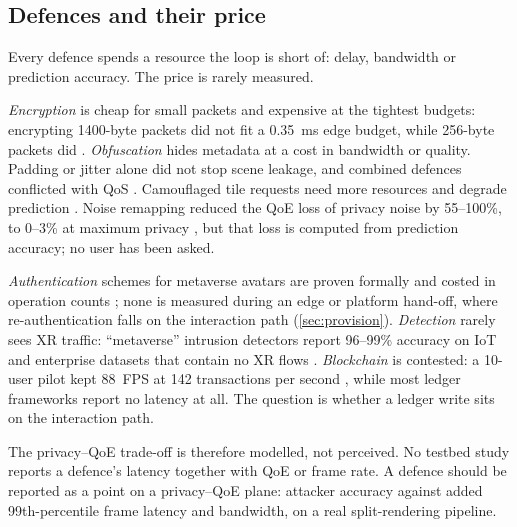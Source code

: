 \subsection{Defences and their price}
Every defence spends a resource the loop is short of: delay, bandwidth or prediction accuracy. The price
is rarely measured.

\emph{Encryption} is cheap for small packets and expensive at the tightest budgets: encrypting 1400-byte
packets did not fit a 0.35~ms edge budget, while 256-byte packets did \cite{W2923086750}.
\emph{Obfuscation} hides metadata at a cost in bandwidth or quality. Padding or jitter alone did not stop
scene leakage, and combined defences conflicted with QoS \cite{W7215028895}. Camouflaged tile requests
need more resources and degrade prediction \cite{W3207744807}. Noise remapping reduced the QoE loss of
privacy noise by 55--100\%, to 0--3\% at maximum privacy \cite{W4396941592}, but that loss is computed
from prediction accuracy; no user has been asked.

\emph{Authentication} schemes for
metaverse avatars are proven formally and costed in operation counts
\cite{W4295788720}; none is measured during an edge or platform hand-off, where re-authentication falls
on the interaction path (\cref{sec:provision}). \emph{Detection} rarely sees XR traffic: ``metaverse''
intrusion detectors report 96--99\% accuracy on IoT and enterprise datasets that contain no XR flows
\cite{W4388011607}. \emph{Blockchain} is contested: a 10-user pilot kept
88~FPS at 142 transactions per second \cite{W7161842864}, while most ledger frameworks report no latency
at all. The question is whether a ledger write sits on the interaction path.

The privacy--QoE trade-off is therefore modelled, not perceived. No testbed study reports a defence's
latency together with QoE or frame rate. A defence should be reported as a point on a privacy--QoE plane:
attacker accuracy against added 99th-percentile frame latency and bandwidth, on a real split-rendering
pipeline.

